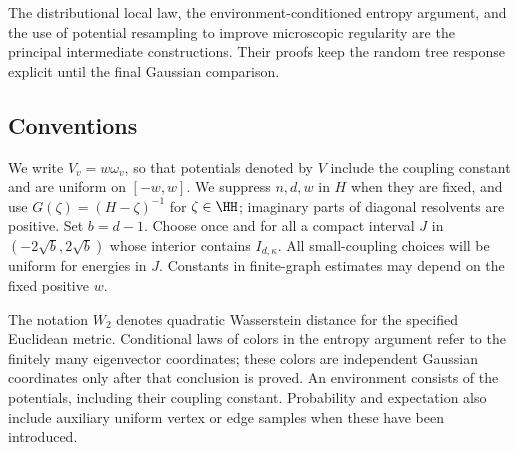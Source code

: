 The distributional local law, the environment-conditioned entropy
argument, and the use of potential resampling to improve microscopic
regularity are the principal intermediate constructions.  Their proofs
keep the random tree response explicit until the final Gaussian
comparison.

\subsection{Conventions}

We write $V_v=w\omega_v$, so that potentials denoted by $V$ include
the coupling constant and are uniform on $[-w,w]$.  We suppress $n,d,w$
in $H$ when they are fixed, and use
$G(\zeta)=(H-\zeta)^{-1}$ for $\zeta\in\HH$; imaginary parts of diagonal
resolvents are positive.  Set $b=d-1$.  Choose once and for all a compact
interval $J$ in $(-2\sqrt b,2\sqrt b)$ whose interior contains
$I_{d,\kappa}$.  All small-coupling choices will be uniform for energies
in $J$.  Constants in finite-graph estimates may depend on the fixed
positive $w$.

The notation $W_2$ denotes quadratic Wasserstein distance for the specified
Euclidean metric.  Conditional laws of colors in the entropy argument
refer to the finitely many eigenvector coordinates; these colors are
independent Gaussian coordinates only after that conclusion is proved.
An environment consists of the potentials, including their coupling
constant.  Probability and expectation also include auxiliary uniform
vertex or edge samples when these have been introduced.

